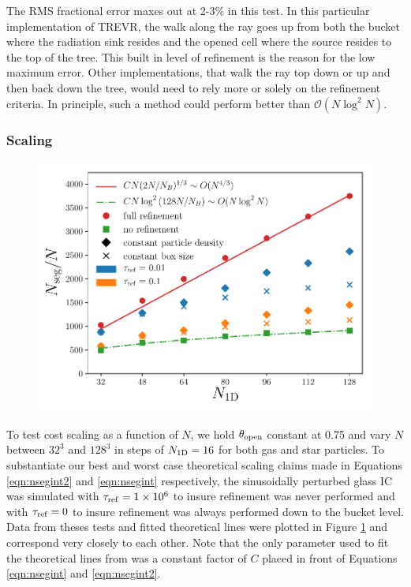 \documentclass[fleq,usenatbib]{mnras}
\newcommand{\acro}{TREVR}
\providecommand{\e}[1]{\ensuremath{\times10^{#1}}}
\newcommand{\bigO}[1]{\mathcal{O}\left(#1\right)}
\newcommand{\tr}{\tau_{\rm ref}}
\newcommand{\tO}{\theta_{\rm open}}
\begin{document}
The RMS fractional error maxes out at 2-3\% in this test. In this particular 
implementation of \acro{}, the walk along the ray goes up from both the bucket 
where the radiation sink resides and the opened cell where the source resides 
to the top of the tree. This built in level of refinement is the reason for 
the low maximum error. Other implementations, that walk the ray top down or up 
and then back down the tree, would need to rely more or solely on the 
refinement criteria. In principle, such a method could perform better than 
$\bigO{N\log^2 N}$.

\subsubsection{Scaling}
\begin{figure}
\includegraphics[width=1\linewidth]{Figures/particle_scaling.pdf}
\caption{}
\label{fig:pscale}
\end{figure}
To test cost scaling as a function of $N$, we hold $\tO$ constant at 0.75 and
vary $N$ between $32^3$ and $128^3$ in steps of $N_{\rm 1D} = 16$ for both gas 
and star particles. To substantiate our best and worst case theoretical 
scaling claims made in Equations \ref{eqn:nsegint2} and \ref{eqn:nsegint} 
respectively, the sinusoidally perturbed glass IC was simulated with $\tr=1\e 6$ 
to insure refinement was never performed and with $\tr=0$ to insure refinement 
was always performed down to the bucket level. Data from theses tests and 
fitted theoretical lines were plotted in Figure \ref{fig:pscale} and 
correspond very closely to each other. Note that the only parameter used to 
fit the theoretical lines from was a constant factor of $C$ placed in front of 
Equations \ref{eqn:nsegint} and \ref{eqn:nsegint2}.
\end{document}
